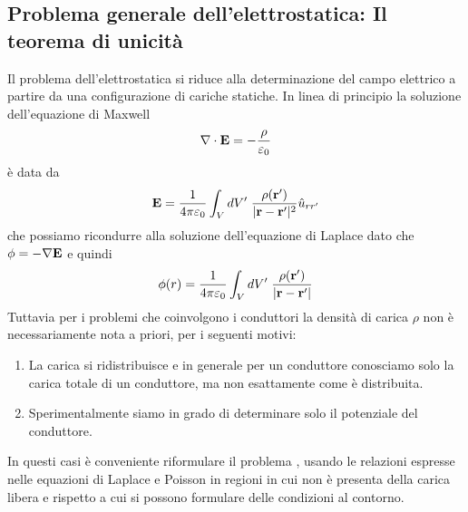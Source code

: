  \subsection{Problema generale dell'elettrostatica: Il teorema di unicit\`a }
 
 Il problema dell'elettrostatica si riduce alla determinazione del campo elettrico a partire da una configurazione di cariche statiche. In linea di principio la soluzione dell'equazione di Maxwell 
 \begin{equation*}
 	\nabla \cdot \bold{E}  = -\frac{\rho}{\varepsilon_0}
 \end{equation*}
 \`e data da 
 \begin{equation*}
 	\bold{E} = \frac{1}{4 \pi \varepsilon_0} \int_{V} dV' \; \frac{\rho(\bold{r}')}{|\bold{r}-\bold{r}'|^2} \hat{u}_{rr'}
 \end{equation*}
 che possiamo ricondurre alla soluzione dell'equazione di Laplace dato che $ \phi = - \nabla \bold{E} $ e quindi
 \begin{equation*}
 	\phi(r) = \frac{1}{4 \pi \varepsilon_0} \int_{V} dV' \; \frac{\rho(\bold{r}')}{|\bold{r}-\bold{r}'|} 
 \end{equation*}
Tuttavia per i problemi che coinvolgono i conduttori la densit\`a di carica $\rho$ non \`e necessariamente nota a priori, per i seguenti motivi:
\begin{enumerate}
	\item La carica si ridistribuisce e in generale per un conduttore conosciamo solo la carica totale di un conduttore, ma non esattamente come \`e distribuita.
	\item Sperimentalmente siamo in grado di determinare solo il potenziale del conduttore.
\end{enumerate}
In questi casi \`e conveniente riformulare il problema , usando le relazioni espresse nelle equazioni di Laplace e Poisson in regioni in cui non \`e presenta della carica libera e rispetto a cui si possono formulare delle condizioni al contorno.

